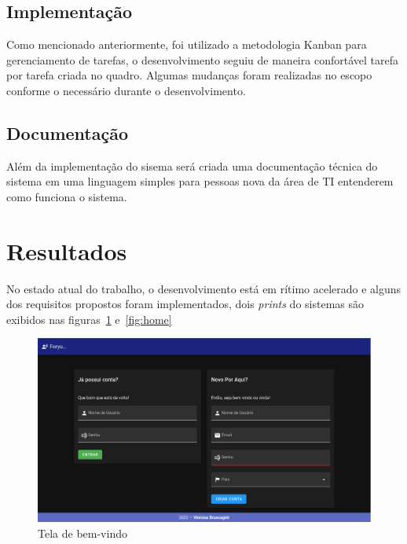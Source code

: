 \documentclass[12pt]{article}
\begin{document}
\subsection{Implementação}

Como mencionado anteriormente, foi utilizado a metodologia Kanban para gerenciamento
de tarefas, o desenvolvimento seguiu de maneira confortável tarefa por tarefa
criada no quadro. Algumas mudanças foram realizadas no escopo conforme o necessário durante o desenvolvimento.

\subsection{Documentação}

Além da implementação do sisema será criada uma documentação técnica do sistema em uma linguagem
simples para pessoas nova da área de TI entenderem como funciona o sistema.

\section{Resultados}

No estado atual do trabalho, o desenvolvimento está em rítimo acelerado e alguns
dos requisitos propostos foram implementados, dois \textit{prints} do sistemas
são exibidos nas figuras~\ref{fig:welcome} e~\ref{fig:home}

\begin{figure}[H]
    \centering
    \includegraphics[width=1\textwidth]{prints/welcome.png}
    \caption{Tela de bem-vindo}\label{fig:welcome}
\end{figure}
\end{document}
